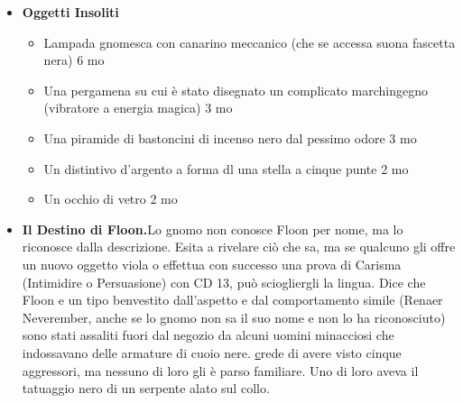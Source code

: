 \documentclass{article}
\begin{document}
\begin{itemize}
    \item \textbf{Oggetti Insoliti} \begin{itemize}
        \item Lampada gnomesca con canarino meccanico (che se accessa suona fascetta nera) 6 mo 
        \item Una pergamena su cui è stato disegnato un complicato
        marchingegno (vibratore a energia magica) 3 mo
        \item Una piramide di bastoncini di incenso nero dal pessimo
        odore 3 mo
        \item Un distintivo d'argento a forma dl una stella a cinque
        punte 2 mo
        \item Un occhio di vetro 2 mo
    \end{itemize}
  \item \textbf{Il Destino di Floon.}Lo gnomo non conosce Floon per nome, ma lo riconosce dalla descrizione. Esita a rivelare ciò che sa, ma se qualcuno gli offre un nuovo oggetto viola o effettua con successo una prova di Carisma (Intimidire o Persuasione) con CD 13, può sciogliergli la lingua. Dice che Floon e un tipo benvestito dall'aspetto e dal comportamento simile (Renaer Neverember, anche se lo gnomo non sa il suo nome e non lo ha riconosciuto) sono stati assaliti fuori dal negozio da alcuni uomini minacciosi che indossavano delle armature di cuoio nere. \hyperlink{Xoblob} crede di avere visto cinque aggressori, ma nessuno di loro gli è parso familiare. Uno di loro aveva il tatuaggio nero di un serpente alato sul collo.
\end{itemize}
\end{document}
